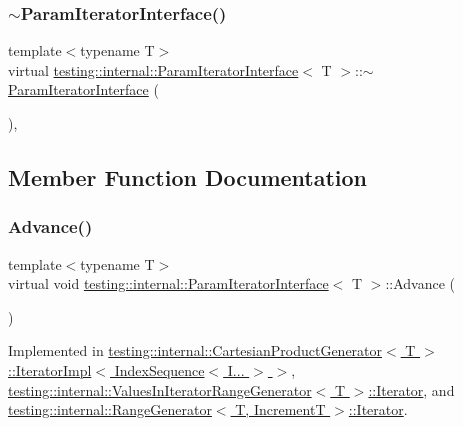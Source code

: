 \subsubsection{\texorpdfstring{$\sim$\+Param\+Iterator\+Interface()}{~ParamIteratorInterface()}}
{\footnotesize\ttfamily template$<$typename T$>$ \\
virtual \hyperlink{classtesting_1_1internal_1_1ParamIteratorInterface}{testing\+::internal\+::\+Param\+Iterator\+Interface}$<$ T $>$\+::$\sim$\hyperlink{classtesting_1_1internal_1_1ParamIteratorInterface}{Param\+Iterator\+Interface} (\begin{DoxyParamCaption}{ }\end{DoxyParamCaption})\hspace{0.3cm}{\ttfamily [inline]}, {\ttfamily [virtual]}}



\subsection{Member Function Documentation}
\mbox{\label{classtesting_1_1internal_1_1ParamIteratorInterface_a600dbd35fcb551463e379516a1abea48}} 
\subsubsection{\texorpdfstring{Advance()}{Advance()}}
{\footnotesize\ttfamily template$<$typename T$>$ \\
virtual void \hyperlink{classtesting_1_1internal_1_1ParamIteratorInterface}{testing\+::internal\+::\+Param\+Iterator\+Interface}$<$ T $>$\+::Advance (\begin{DoxyParamCaption}{ }\end{DoxyParamCaption})\hspace{0.3cm}{\ttfamily [pure virtual]}}



Implemented in \hyperlink{classtesting_1_1internal_1_1CartesianProductGenerator_1_1IteratorImpl_3_01IndexSequence_3_01I_8_8_8_01_4_01_4_a167e8b38118c8635d5849daf924a517b}{testing\+::internal\+::\+Cartesian\+Product\+Generator$<$ T $>$\+::\+Iterator\+Impl$<$ Index\+Sequence$<$ I... $>$ $>$}, \hyperlink{classtesting_1_1internal_1_1ValuesInIteratorRangeGenerator_1_1Iterator_a5ff56489536cf5d90ed0ac07ffeb476b}{testing\+::internal\+::\+Values\+In\+Iterator\+Range\+Generator$<$ T $>$\+::\+Iterator}, and \hyperlink{classtesting_1_1internal_1_1RangeGenerator_1_1Iterator_ad17bd99e352c43b8ab654a4ad479d06e}{testing\+::internal\+::\+Range\+Generator$<$ T, Increment\+T $>$\+::\+Iterator}.

